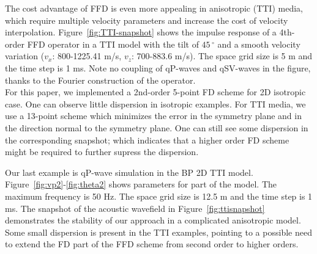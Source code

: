 
The cost advantage of FFD is even more appealing in anisotropic (TTI) media, 
which require multiple velocity parameters and increase the cost of velocity interpolation.
Figure~\ref{fig:TTI-snapshot} shows the impulse response of a 4th-order FFD operator 
in a TTI model with the tilt of $45\,^{\circ}$ and a smooth velocity variation ($v_x$: 800-1225.41 m/s, $v_z$: 700-883.6 m/s). The space grid size is 5 m and the time step is 1 ms. 
Note no coupling of qP-waves and qSV-waves \cite[]{zhang2} in the figure, 
thanks to the Fourier construction of the operator.\\

For this paper, we implemented a 2nd-order 5-point FD scheme for 2D isotropic case. 
One can observe little dispersion in isotropic examples. For TTI media, we use a 13-point scheme which minimizes the error in the symmetry plane and in the direction normal to the symmetry plane. One can still see some dispersion in the corresponding snapshot; which indicates that a higher order FD scheme might be required to further supress the dispersion.\\ 



Our last example is qP-wave simulation in the BP 2D TTI model. 
Figure~\ref{fig:vp2}-\ref{fig:theta2} shows parameters for part of the model.
The maximum frequency is 50 Hz. The space grid size is 12.5 m and the time step is 1 ms.
The snapshot of the acoustic wavefield in Figure~\ref{fig:ttisnapshot} demonstrates the stability of our approach in a complicated anisotropic model.
Some small dispersion is present in the TTI examples, pointing to a possible need to extend the FD part of the FFD scheme from second order to higher orders.



